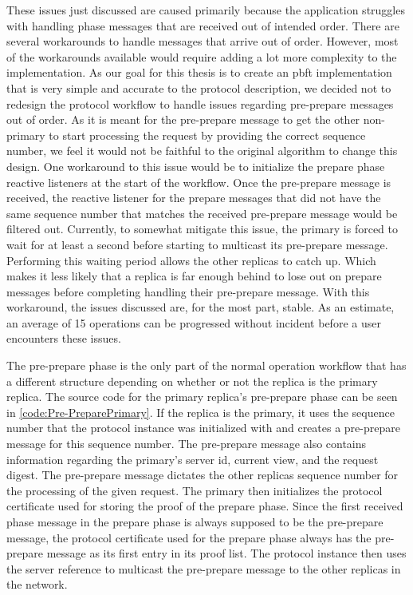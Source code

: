 These issues just discussed are caused primarily because the application struggles with handling phase messages that are received out of intended order. There are several workarounds to handle messages that arrive out of order. However, most of the workarounds available would require adding a lot more complexity to the implementation. As our goal for this thesis is to create an \ac{pbft} implementation that is very simple and accurate to the protocol description, we decided not to redesign the protocol workflow to handle issues regarding pre-prepare messages out of order. As it is meant for the pre-prepare message to get the other non-primary to start processing the request by providing the correct sequence number, we feel it would not be faithful to the original algorithm to change this design. One workaround to this issue would be to initialize the prepare phase reactive listeners at the start of the workflow. Once the pre-prepare message is received, the reactive listener for the prepare messages that did not have the same sequence number that matches the received pre-prepare message would be filtered out. Currently, to somewhat mitigate this issue, the primary is forced to wait for at least a second before starting to multicast its pre-prepare message. Performing this waiting period allows the other replicas to catch up. Which makes it less likely that a replica is far enough behind to lose out on prepare messages before completing handling their pre-prepare message. With this workaround, the issues discussed are, for the most part, stable. As an estimate, an average of 15 operations can be progressed without incident before a user encounters these issues.
\fi

The pre-prepare phase is the only part of the normal operation workflow that has a different structure depending on whether or not the replica is the primary replica. The source code for the primary replica’s pre-prepare phase can be seen in \autoref{code:Pre-PreparePrimary}. If the replica is the primary, it uses the sequence number that the protocol instance was initialized with and creates a pre-prepare message for this sequence number. The pre-prepare message also contains information regarding the primary’s server id, current view, and the request digest. The pre-prepare message dictates the other replicas sequence number for the processing of the given request. The primary then initializes the protocol certificate used for storing the proof of the prepare phase. Since the first received phase message in the prepare phase is always supposed to be the pre-prepare message, the protocol certificate used for the prepare phase always has the pre-prepare message as its first entry in its proof list. The protocol instance then uses the server reference to multicast the pre-prepare message to the other replicas in the network. 

